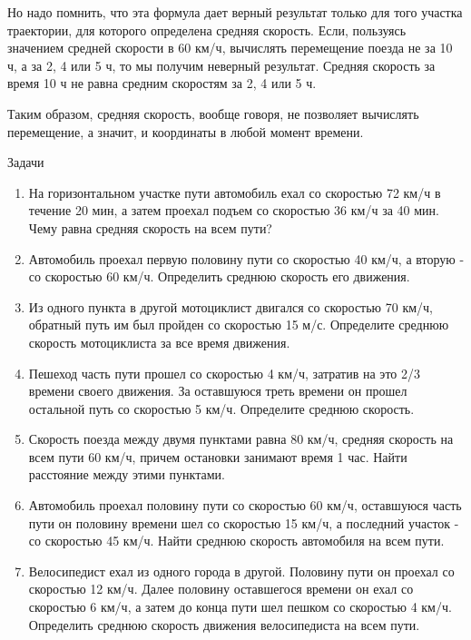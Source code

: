 \documentclass[a6paper, 11pt]{diss_4}
\renewcommand{\'}{\,'}
\begin{document}
 Но надо помнить, что эта формула дает верный результат только для того участка
траектории, для которого определена средняя скорость. Если, пользуясь значением
средней скорости в 60 км/ч, вычислять перемещение поезда не за 10 ч, а за 2, 4
или 5 ч, то мы получим неверный результат. Средняя скорость за время 10 ч не
равна средним скоростям за 2, 4 или 5 ч.

Таким образом, средняя скорость, вообще говоря, не позволяет вычислять
перемещение, а значит, и координаты в любой момент времени.

\begin{center}
   Задачи
\end{center}
\begin{enumerate}
\item На горизонтальном участке пути автомобиль ехал со скоростью 72 км/ч в
течение 20 мин, а затем проехал подъем со скоростью 36 км/ч за 40 мин. Чему
равна средняя скорость на всем пути?

\item Автомобиль проехал первую половину пути со скоростью 40 км/ч, а вторую
- со скоростью 60 км/ч. Определить среднюю скорость его движения.

\item Из одного пункта в другой мотоциклист двигался со скоростью 70 км/ч,
обратный путь им был пройден со скоростью 15 м/с. Определите среднюю скорость
мотоциклиста за все время движения.

\item Пешеход часть пути прошел со скоростью 4 км/ч, затратив на это 2/3 времени
 своего движения. За оставшуюся треть времени он прошел остальной путь со
  скоростью 5 км/ч. Определите среднюю скорость.

\item Скорость поезда между двумя пунктами равна 80 км/ч, средняя скорость на
всем пути 60 км/ч, причем остановки занимают время 1 час. Найти расстояние между
 этими пунктами.

\item Автомобиль проехал половину пути со скоростью 60 км/ч, оставшуюся часть
пути он половину времени шел со скоростью 15 км/ч, а последний участок - со
скоростью 45 км/ч. Найти среднюю скорость автомобиля на всем пути.

\item Велосипедист ехал из одного города в другой. Половину пути он проехал со
скоростью 12 км/ч. Далее половину оставшегося времени он ехал со скоростью
6 км/ч, а затем до конца пути шел пешком со скоростью 4 км/ч. Определить среднюю
скорость движения велосипедиста на всем пути.
\end{enumerate}
\end{document}
